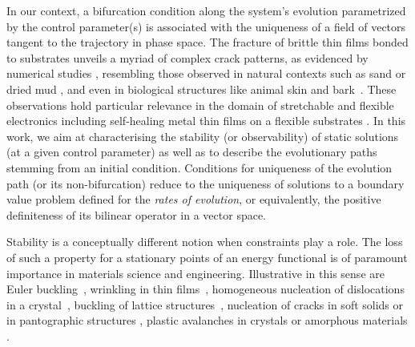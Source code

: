 \documentclass[10pt]{article}
\begin{document}
In our context, a bifurcation condition along the system's evolution parametrized by the control parameter(s) is associated with  the uniqueness of a field of vectors tangent to the trajectory in phase space.
    {The fracture of brittle thin films bonded to substrates unveils a myriad of complex crack patterns, as evidenced by numerical studies \cite{Baldelli2014-ho,Alessi2019-bx,Hu2020-nt,Salman2021-mn,Baldelli2021-gc}, resembling those observed in natural contexts such as sand or dried mud \cite{Goehring2010-xz}, and even in biological structures like animal skin \cite{Qin2014-wz} and bark~\cite{chattaway:1955, shen:2020}. These observations hold particular relevance in the domain of stretchable and flexible electronics \cite{Faurie2019-to,Godard2022-ss} including  self-healing metal thin films on a flexible substrates \cite{Trost2024-ca}.}
In this work, we aim at characterising the stability (or observability) of static solutions (at a given control parameter) as well as to describe the evolutionary paths stemming from an initial condition. Conditions for uniqueness of the evolution path (or its non-bifurcation) reduce to the uniqueness of solutions to a boundary value problem defined for the \emph{rates of evolution}, or equivalently, the positive definiteness of its bilinear operator in a vector space.

Stability is a conceptually different notion when constraints play a role.
The loss of such a property for a stationary points of an energy functional is of paramount importance in materials science and engineering. Illustrative in this sense are Euler buckling~\cite{Bettiol2020-ey}, wrinkling in thin films~\cite{Hutchinson2013-jk}, homogeneous nucleation of dislocations in a crystal~\cite{Carpio2005-bv,Plans2007-cx,Baggio2019-rs,Mayer2022-km,Baggio2023-qu}, buckling of lattice structures~\cite{Combescure2016-dy,Bertoldi2008-au}, nucleation of cracks in soft solids or in pantographic structures \cite{Riccobelli2023-fc,Salman2021-mn}, plastic  avalanches in crystals or amorphous materials \cite{Zhang2020-ax,Weiss2021-db,Yang2020-zm}.
\end{document}
